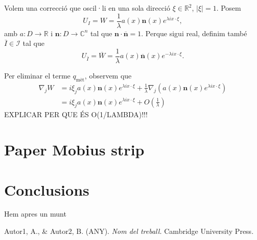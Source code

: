 \documentclass[11pt,a4paper,openright,oneside]{book}
\numberwithin{equation}{section}
\theoremstyle{definition}
\begin{document}
Volem una correcció que oscil·li en una sola direcció $\xi\in\mathbb R^2$, $|\xi|=1$. Posem
\begin{equation*}
    U_I = W = \frac1\lambda a(x)\textbf{n}(x)e^{\lambda i x \cdot \xi},
\end{equation*}
amb $a:D\to\mathbb R$ i $\textbf{n}:D\to\mathbb C^n$ tal que $\textbf{n}\cdot \overline{\textbf{n}}=1$. Perque sigui real, definim també $\overline I\in\mathcal I$ tal que 
\begin{equation*}
    U_{\overline{I}} = \overline W = \frac1\lambda a(x)\overline{\textbf{n}}(x)e^{-\lambda i x \cdot \xi}.
\end{equation*}

Per eliminar el terme $q_{\text{mèt}}$, observem que
\begin{equation*}
    \begin{aligned}
    \nabla_j W &= i\xi_j a(x)\textbf{n}(x)e^{\lambda i x \cdot \xi} + \frac{1}{\lambda}\nabla_j (a(x)\textbf{n}(x)e^{\lambda i x \cdot \xi})\\
    &=i\xi_j a(x)\textbf{n}(x)e^{\lambda i x \cdot \xi} + O(\frac{1}{\lambda})
    \end{aligned}
\end{equation*}
EXPLICAR PER QUE ÉS O(1/LAMBDA)!!!





\newpage
\chapter{Paper Mobius strip}

\newpage
\chapter{Conclusions}

Hem apres un munt

\normalfont

\newpage

\begin{thebibliography}{25}

Autor1, A., \& Autor2, B. (ANY).
\newblock \textit{Nom del treball.}
\newblock Cambridge University Press.

\end{thebibliography}
\end{document}
